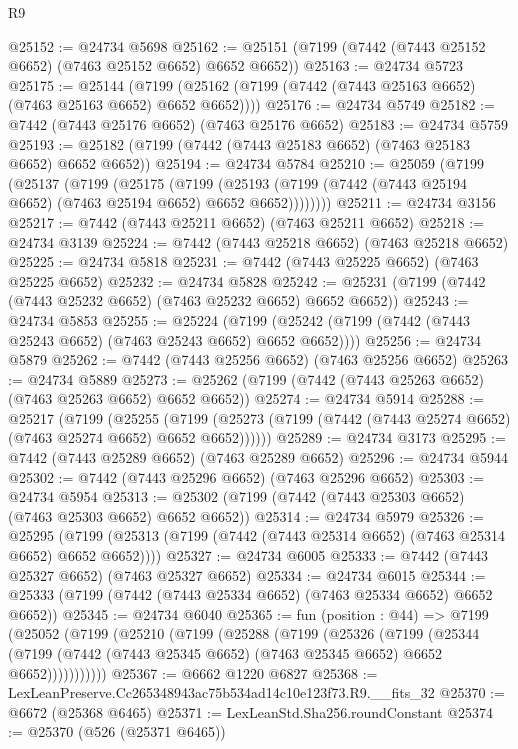 \begin{lexlean}{R9}
\begin{coremodule}
@25152 := @24734 @5698
@25162 := @25151 (@7199 (@7442 (@7443 @25152 @6652) (@7463 @25152 @6652) @6652 @6652))
@25163 := @24734 @5723
@25175 := @25144
    (@7199 (@25162 (@7199 (@7442 (@7443 @25163 @6652) (@7463 @25163 @6652) @6652 @6652))))
@25176 := @24734 @5749
@25182 := @7442 (@7443 @25176 @6652) (@7463 @25176 @6652)
@25183 := @24734 @5759
@25193 := @25182 (@7199 (@7442 (@7443 @25183 @6652) (@7463 @25183 @6652) @6652 @6652))
@25194 := @24734 @5784
@25210 := @25059
    (@7199
      (@25137
        (@7199
          (@25175
            (@7199
              (@25193 (@7199 (@7442 (@7443 @25194 @6652) (@7463 @25194 @6652) @6652 @6652))))))))
@25211 := @24734 @3156
@25217 := @7442 (@7443 @25211 @6652) (@7463 @25211 @6652)
@25218 := @24734 @3139
@25224 := @7442 (@7443 @25218 @6652) (@7463 @25218 @6652)
@25225 := @24734 @5818
@25231 := @7442 (@7443 @25225 @6652) (@7463 @25225 @6652)
@25232 := @24734 @5828
@25242 := @25231 (@7199 (@7442 (@7443 @25232 @6652) (@7463 @25232 @6652) @6652 @6652))
@25243 := @24734 @5853
@25255 := @25224
    (@7199 (@25242 (@7199 (@7442 (@7443 @25243 @6652) (@7463 @25243 @6652) @6652 @6652))))
@25256 := @24734 @5879
@25262 := @7442 (@7443 @25256 @6652) (@7463 @25256 @6652)
@25263 := @24734 @5889
@25273 := @25262 (@7199 (@7442 (@7443 @25263 @6652) (@7463 @25263 @6652) @6652 @6652))
@25274 := @24734 @5914
@25288 := @25217
    (@7199
      (@25255
        (@7199 (@25273 (@7199 (@7442 (@7443 @25274 @6652) (@7463 @25274 @6652) @6652 @6652))))))
@25289 := @24734 @3173
@25295 := @7442 (@7443 @25289 @6652) (@7463 @25289 @6652)
@25296 := @24734 @5944
@25302 := @7442 (@7443 @25296 @6652) (@7463 @25296 @6652)
@25303 := @24734 @5954
@25313 := @25302 (@7199 (@7442 (@7443 @25303 @6652) (@7463 @25303 @6652) @6652 @6652))
@25314 := @24734 @5979
@25326 := @25295
    (@7199 (@25313 (@7199 (@7442 (@7443 @25314 @6652) (@7463 @25314 @6652) @6652 @6652))))
@25327 := @24734 @6005
@25333 := @7442 (@7443 @25327 @6652) (@7463 @25327 @6652)
@25334 := @24734 @6015
@25344 := @25333 (@7199 (@7442 (@7443 @25334 @6652) (@7463 @25334 @6652) @6652 @6652))
@25345 := @24734 @6040
@25365 := fun (position : @44) =>
  @7199
    (@25052
      (@7199
        (@25210
          (@7199
            (@25288
              (@7199
                (@25326
                  (@7199
                    (@25344
                      (@7199 (@7442 (@7443 @25345 @6652) (@7463 @25345 @6652) @6652 @6652)))))))))))
@25367 := @6662 @1220 @6827
@25368 := LexLeanPreserve.Cc265348943ac75b534ad14c10e123f73.R9.__fits_32
@25370 := @6672 (@25368 @6465)
@25371 := LexLeanStd.Sha256.roundConstant
@25374 := @25370 (@526 (@25371 @6465))

\end{coremodule}
\end{lexlean}

